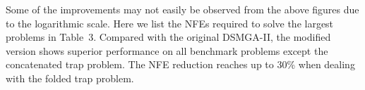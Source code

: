 \documentclass{sig-alternate-05-2015}
\begin{document}
%  

Some of the improvements may not easily be observed from the above figures due to the logarithmic scale. Here we list the NFEs required to solve the largest problems in Table~3.  Compared with the original DSMGA-II, the modified version shows superior performance on all benchmark problems except the concatenated trap problem. The NFE reduction reaches up to 30\% when dealing with the folded trap problem.
\end{document}
